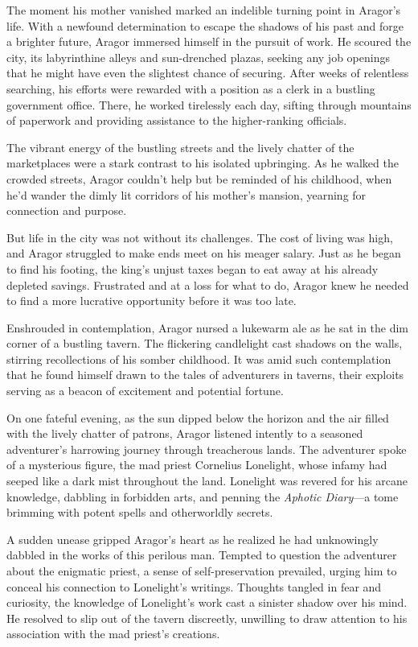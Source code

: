 The moment his mother vanished marked an indelible turning point in Aragor's life. With a newfound determination to escape the shadows of his past and forge a brighter future, Aragor immersed himself in the pursuit of work. He scoured the city, its labyrinthine alleys and sun-drenched plazas, seeking any job openings that he might have even the slightest chance of securing. After weeks of relentless searching, his efforts were rewarded with a position as a clerk in a bustling government office. There, he worked tirelessly each day, sifting through mountains of paperwork and providing assistance to the higher-ranking officials.


The vibrant energy of the bustling streets and the lively chatter of the marketplaces were a stark contrast to his isolated upbringing. As he walked the crowded streets, Aragor couldn't help but be reminded of his childhood, when he'd wander the dimly lit corridors of his mother's mansion, yearning for connection and purpose. 

But life in the city was not without its challenges. The cost of living was high, and Aragor struggled to make ends meet on his meager salary. Just as he began to find his footing, the king's unjust taxes began to eat away at his already depleted savings. Frustrated and at a loss for what to do, Aragor knew he needed to find a more lucrative opportunity before it was too late.

Enshrouded in contemplation, Aragor nursed a lukewarm ale as he sat in the dim corner of a bustling tavern. The flickering candlelight cast shadows on the walls, stirring recollections of his somber childhood. It was amid such contemplation that he found himself drawn to the tales of adventurers in taverns, their exploits serving as a beacon of excitement and potential fortune. 

On one fateful evening, as the sun dipped below the horizon and the air filled with the lively chatter of patrons, Aragor listened intently to a seasoned adventurer's harrowing journey through treacherous lands. The adventurer spoke of a mysterious figure, the mad priest Cornelius Lonelight, whose infamy had seeped like a dark mist throughout the land. Lonelight was revered for his arcane knowledge, dabbling in forbidden arts, and penning the \textit{Aphotic Diary}—a tome brimming with potent spells and otherworldly secrets.

A sudden unease gripped Aragor's heart as he realized he had unknowingly dabbled in the works of this perilous man. Tempted to question the adventurer about the enigmatic priest, a sense of self-preservation prevailed, urging him to conceal his connection to Lonelight's writings. Thoughts tangled in fear and curiosity, the knowledge of Lonelight's work cast a sinister shadow over his mind. He resolved to slip out of the tavern discreetly, unwilling to draw attention to his association with the mad priest's creations.

